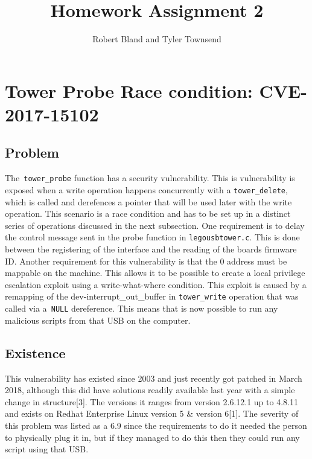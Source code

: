 \documentclass[12pt]{article}
\author{Robert Bland and Tyler Townsend}
\title{Homework Assignment 2}
\begin{document}
\maketitle

\section{Tower Probe Race condition: CVE-2017-15102} 

\subsection{Problem}
The\texttt{ tower\_probe} function has a security vulnerability. This is vulnerability is exposed when a write operation happens concurrently with a \texttt{tower\_delete}, which is called and derefences a pointer that will be used later with the write operation. This scenario is a race condition and has to be set up in a distinct series of operations discussed in the next subsection.  One requirement is to delay the control message sent in the probe function in \texttt{legousbtower.c}. This is done between the registering of the interface and the reading of the boards firmware ID. Another requirement for this vulnerability is that the 0 address must be mappable on the machine. This allows it to be possible to create a local privilege escalation exploit using a write-what-where condition. This exploit is caused by a remapping of the dev-interrupt\_out\_buffer in \texttt{tower\_write} operation that was called via a\texttt{ NULL} dereference. This means that is now possible to run any malicious scripts from that USB on the computer. 

\subsection{Existence}
This vulnerability has existed since 2003 and just recently got patched in March 2018, although this did have solutions readily available last year with a simple change in structure[3]. The versions it ranges from version 2.6.12.1 up to 4.8.11 and exists on Redhat Enterprise Linux version 5 \& version 6[1]. The severity of this problem was listed as a 6.9 since the requirements to do it needed the person to physically plug it in, but if they managed to do this then they could run any script using that USB\cite{NVD}.
\end{document}
